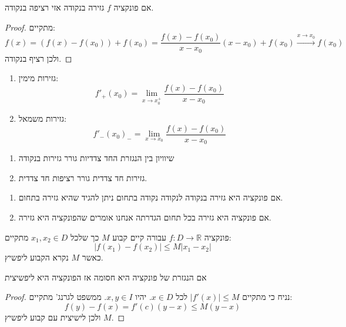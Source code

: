 \documentclass{tstextbook}
\begin{document}
\begin{proposition}
אם פונקציה \(f\) גזירה בנקודה אזי רציפה בנקודה.

\end{proposition}
\begin{proof}
מתקיים:
$$f(x)=(f(x)-f(x_{0}))+f(x_{0})=\frac{f(x)-f(x_{0})}{x-x_{0}}(x-x_{0})+f(x_{0})\xrightarrow{x\to x_{0}} f(x_{0})$$
ולכן רציף בנקודה.

\end{proof}
\begin{definition}
  \begin{enumerate}
    \item גזירות מימין: 
$$f'_{+}(x_{0})=\lim_{ x \to x_{0}^{+} } \frac{f(x)-f(x_{0})}{x-x_{0}}$$


    \item גזירות משמאל: 
$$f'_{-}(x_{0})_{-}=\lim_{ x \to x_{0} } \frac{f(x)-f(x_{0})}{x-x_{0}}$$


  \end{enumerate}
\end{definition}
\begin{proposition}
  \begin{enumerate}
    \item שיוויון בין הנגזרת החד צדדיות גורר גזירות בנקודה 


    \item גזירות חד צדדית גורר רציפות חד צדדית. 


  \end{enumerate}
\end{proposition}
\begin{definition}
  \begin{enumerate}
    \item אם פונקציה היא גזירה בנקודה לנקודה נקודה בתחום ניתן להגיד שהיא גזירה בתחום. 


    \item אם פונקציה היא גזירה בכל תחום הגדרתה אנחנו אומרים שהפונקציה היא גזירה. 


  \end{enumerate}
\end{definition}
\begin{definition}
פונקציה \(f:D\to \mathbb{R}\) עבורה קיים קבוע \(M\) כך שלכל \(x_{1},x_{2} \in D\) מתקיים:
$$\lvert f(x_{1})-f(x_{2}) \rvert \leq M|x_{1}-x_{2}|$$
כאשר \(M\) נקרא הקבוע ליפשיץ.

\end{definition}
\begin{proposition}
אם הנגזרת של פונקציה היא חסומה אז הפונקציה היא ליפשיצית

\end{proposition}
\begin{proof}
נניח כי מתקיים \(\lvert f'(x) \rvert\leq M\) לכל \(x \in D\). יהיו \(x,y \in I\). ממשפט לגרנג' מתקיים:
$$f(y)-f(x)=f'(c)(y-x)\leq M(y - x)$$
ולכן לישיצית עם קבוע ליפשיץ \(M\).

\end{proof}
\end{document}
